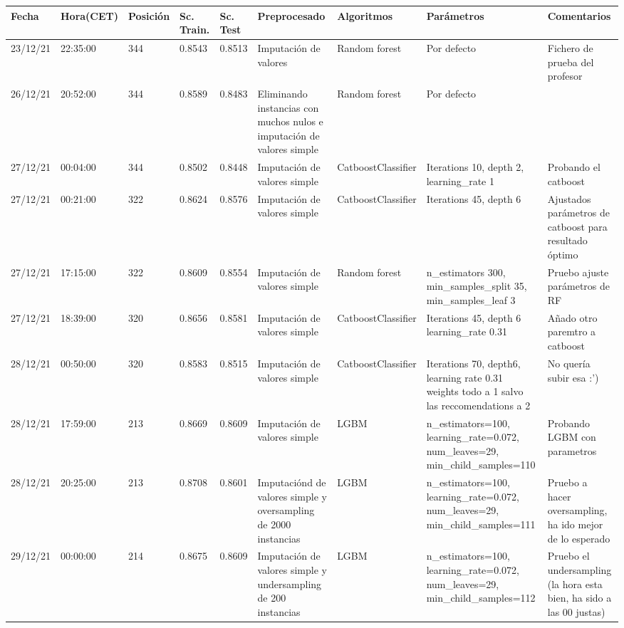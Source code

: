 \documentclass[twoside,openright,titlepage,numbers=noenddot,openany,headinclude,footinclude=true,
cleardoublepage=empty,abstractoff,BCOR=5mm,paper=a4,fontsize=12pt,main=spanish]{scrreprt}
\begin{document}
\tiny
\begin{longtable}{|l|l|l|l|l|m{7em}|m{7em}|m{7em}|m{7em}|}

        Fecha & Hora(CET) & Posición & Sc. Train. & Sc. Test & Preprocesado & Algoritmos & Parámetros & Comentarios \\ \hline
        23/12/21 & 22:35:00 & 344 & 0.8543 & 0.8513 & Imputación de valores & Random forest & Por defecto & Fichero de prueba del profesor \\ \hline
        26/12/21 & 20:52:00 & 344 & 0.8589 & 0.8483 & Eliminando instancias con muchos nulos  e imputación de valores simple & Random forest & Por defecto & ~ \\ \hline
        27/12/21 & 00:04:00 & 344 & 0.8502 & 0.8448 & Imputación de valores simple & CatboostClassifier & Iterations 10, depth 2, learning\_rate 1 & Probando el catboost \\ \hline
        27/12/21 & 00:21:00 & 322 & 0.8624 & 0.8576 & Imputación de valores simple & CatboostClassifier & Iterations 45, depth 6 & Ajustados parámetros de catboost para resultado óptimo \\ \hline
        27/12/21 & 17:15:00 & 322 & 0.8609 & 0.8554 & Imputación de valores simple & Random forest & n\_estimators 300, min\_samples\_split 35, min\_samples\_leaf 3  & Pruebo ajuste parámetros de RF \\ \hline
        27/12/21 & 18:39:00 & 320 & 0.8656 & 0.8581 & Imputación de valores simple & CatboostClassifier & Iterations 45, depth 6 learning\_rate 0.31 & Añado otro paremtro a catboost \\ \hline
        28/12/21 & 00:50:00 & 320 & 0.8583 & 0.8515 & Imputación de valores simple & CatboostClassifier & Iterations 70, depth6,  learning rate 0.31 weights todo a 1 salvo las reccomendations a 2 & No quería subir esa :’) \\ \hline
        28/12/21 & 17:59:00 & 213 & 0.8669 & 0.8609 & Imputación de valores simple & LGBM & n\_estimators=100, learning\_rate=0.072, num\_leaves=29, min\_child\_samples=110 & Probando LGBM con parametros \\ \hline
        28/12/21 & 20:25:00 & 213 & 0.8708 & 0.8601 & Imputaciónd de valores simple y oversampling de 2000 instancias & LGBM & n\_estimators=100, learning\_rate=0.072, num\_leaves=29, min\_child\_samples=111 & Pruebo a hacer oversampling, ha ido mejor de lo esperado \\ \hline
        29/12/21 & 00:00:00 & 214 & 0.8675 & 0.8609 & Imputación de valores simple y undersampling de 200 instancias & LGBM & n\_estimators=100, learning\_rate=0.072, num\_leaves=29, min\_child\_samples=112 & Pruebo el undersampling (la hora esta bien, ha sido a las 00 justas) \\ \hline

\end{longtable}
\end{document}
